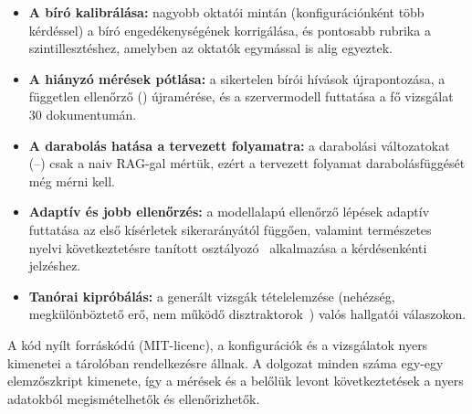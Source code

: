 \begin{itemize}
\item \textbf{A bíró kalibrálása:} nagyobb oktatói mintán (konfigurációnként több kérdéssel) a bíró
engedékenységének korrigálása, és pontosabb rubrika a szintillesztéshez, amelyben az oktatók egymással is
alig egyeztek.
\item \textbf{A hiányzó mérések pótlása:} a sikertelen bírói hívások újrapontozása, a független ellenőrző
() újramérése, és a szervermodell futtatása a fő vizsgálat 30 dokumentumán.
\item \textbf{A darabolás hatása a tervezett folyamatra:} a darabolási változatokat (--)
csak a naiv RAG-gal mértük, ezért a tervezett folyamat darabolásfüggését még mérni kell.
\item \textbf{Adaptív és jobb ellenőrzés:} a modellalapú ellenőrző lépések adaptív futtatása az első kísérletek sikerarányától függően, valamint
természetes nyelvi következtetésre tanított osztályozó~\cite{laban2022summac} alkalmazása a kérdésenkénti jelzéshez.
\item \textbf{Tanórai kipróbálás:} a generált vizsgák tételelemzése (nehézség, megkülönböztető erő, nem működő
disztraktorok~\cite{tarrant2009distractors}) valós hallgatói válaszokon.
\end{itemize}

A kód nyílt forráskódú (MIT-licenc), a konfigurációk és a vizsgálatok nyers kimenetei a
tárolóban rendelkezésre állnak. A dolgozat minden száma egy-egy elemzőszkript kimenete, így a mérések és a
belőlük levont következtetések a nyers adatokból megismételhetők és ellenőrizhetők.
